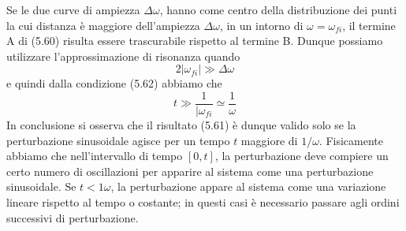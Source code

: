 Se le due curve di ampiezza $\Delta \omega$, hanno come centro della distribuzione dei punti la cui distanza \`e maggiore dell'ampiezza $\Delta \omega$, in un intorno di $\omega = \omega_{fi}$, il termine A di (5.60) risulta essere trascurabile rispetto al termine B. Dunque possiamo utilizzare l'approssimazione di risonanza quando
\begin{equation}
	2|\omega_{fi}| \gg \Delta \omega
\end{equation} 
e quindi dalla condizione (5.62) abbiamo che 
\begin{equation*}
	t \gg \frac{1}{|\omega_{fi}} \simeq \frac{1}{\omega}
\end{equation*}
In conclusione si osserva che il risultato (5.61) \`e dunque valido solo se la perturbazione sinusoidale agisce per un tempo $t$ maggiore di $1/\omega$. Fisicamente abbiamo che nell'intervallo di tempo $[0,t]$, la perturbazione deve compiere un certo numero di oscillazioni per apparire al sistema come una perturbazione sinusoidale. Se $t < 1 \omega$, la perturbazione appare al sistema come una variazione lineare rispetto al tempo o costante; in questi casi \`e necessario passare agli ordini successivi di perturbazione.

